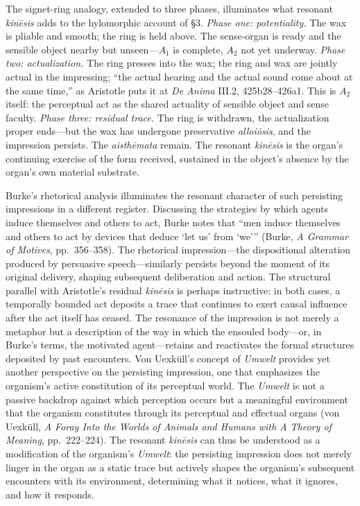 \documentclass[12pt]{article}
\begin{document}
The signet-ring analogy, extended to three phases, illuminates what resonant \textit{kinēsis} adds to the hylomorphic account of §3. \textit{Phase one: potentiality.} The wax is pliable and smooth; the ring is held above. The sense-organ is ready and the sensible object nearby but unseen---$A_1$ is complete, $A_2$ not yet underway. \textit{Phase two: actualization.} The ring presses into the wax; the ring and wax are jointly actual in the impressing; ``the actual hearing and the actual sound come about at the same time,'' as Aristotle puts it at \textit{De Anima} III.2, 425b28--426a1. This is $A_2$ itself: the perceptual act as the shared actuality of sensible object and sense faculty. \textit{Phase three: residual trace.} The ring is withdrawn, the actualization proper ends---but the wax has undergone preservative \textit{alloiōsis}, and the impression persists. The \textit{aisthēmata} remain. The resonant \textit{kinēsis} is the organ's continuing exercise of the form received, sustained in the object's absence by the organ's own material substrate.

Burke's rhetorical analysis illuminates the resonant character of such persisting impressions in a different register. Discussing the strategies by which agents induce themselves and others to act, Burke notes that ``men induce themselves and others to act by devices that deduce `let us' from `we''' (Burke, \textit{A Grammar of Motives}, pp.~356--358). The rhetorical impression---the dispositional alteration produced by persuasive speech---similarly persists beyond the moment of its original delivery, shaping subsequent deliberation and action. The structural parallel with Aristotle's residual \textit{kinēsis} is perhaps instructive: in both cases, a temporally bounded act deposits a trace that continues to exert causal influence after the act itself has ceased. The resonance of the impression is not merely a metaphor but a description of the way in which the ensouled body---or, in Burke's terms, the motivated agent---retains and reactivates the formal structures deposited by past encounters. Von Uexküll's concept of \textit{Umwelt} provides yet another perspective on the persisting impression, one that emphasizes the organism's active constitution of its perceptual world. The \textit{Umwelt} is not a passive backdrop against which perception occurs but a meaningful environment that the organism constitutes through its perceptual and effectual organs (von Uexküll, \textit{A Foray Into the Worlds of Animals and Humans with A Theory of Meaning}, pp.~222--224). The resonant \textit{kinēsis} can thus be understood as a modification of the organism's \textit{Umwelt}: the persisting impression does not merely linger in the organ as a static trace but actively shapes the organism's subsequent encounters with its environment, determining what it notices, what it ignores, and how it responds.
\end{document}
